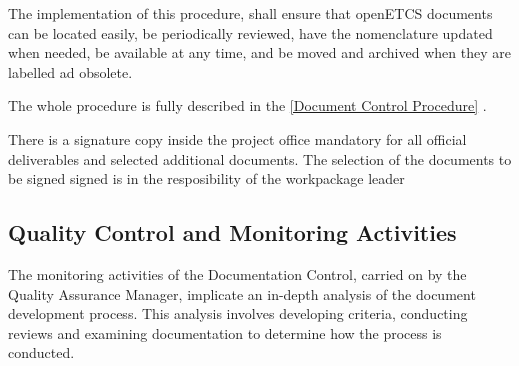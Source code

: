 \documentclass{template/openetcs_article}
\begin{document}
The implementation of this procedure, shall ensure that openETCS documents can be located easily, be periodically reviewed, have the nomenclature updated when needed, be available at any time, and be moved and archived when they are labelled ad obsolete.

The whole procedure is fully described in the \href{https://github.com/openETCS/governance/tree/master/Document%20Control%20Process}{[Document Control Procedure]} .

There is a signature copy inside the project office mandatory for all official deliverables and selected additional documents. The selection of the documents to be signed signed is in the resposibility of the workpackage leader

\subsection{Quality Control and Monitoring Activities}
The monitoring activities of the Documentation Control, carried on by the Quality Assurance Manager, implicate an in-depth analysis of the document development process. This analysis involves developing criteria, conducting reviews and examining documentation to determine how the process is conducted.
\end{document}
